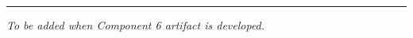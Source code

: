 \documentclass[11pt]{article}
\begin{document}
\vspace{0.5cm}
\begin{center}
\rule{0.6\textwidth}{0.4pt}
\end{center}
\vspace{0.3cm}

\noindent{\large\textbf{\textcolor{solvercolor}{Component 6: Dual Reward Structure}}}

\vspace{0.15cm}
\noindent\textit{To be added when Component 6 artifact is developed.}
\end{document}
